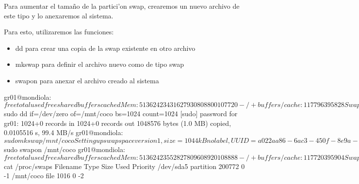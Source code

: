 
Para aumentar el tama\~{n}o de la partici'on swap, crearemos un
nuevo archivo de este tipo y lo anexaremos al sistema.

Para esto, utilizaremos las funciones:

\begin{itemize}
\item dd para crear una copia de la swap existente en otro archivo
\item mkswap para definir el archivo nuevo como de tipo swap
\item swapon para anexar el archivo creado al sistema
\end{itemize}

\begin{envCodigo}
gr01@mondiola:~$ free
             total       used       free     shared    buffers     cached
Mem:        513624     234316     279308          0       8800     107720
-/+ buffers/cache:     117796     395828
Swap:       200772          0     200772
gr01@mondiola:~$ sudo dd if=/dev/zero of=/mnt/coco bs=1024 count=1024
[sudo] password for gr01:
1024+0 records in
1024+0 records out
1048576 bytes (1.0 MB) copied, 0.0105516 s, 99.4 MB/s
gr01@mondiola:~$ sudo mkswap /mnt/coco
Setting up swapspace version 1, size = 1044 kB
no label, UUID=a022aa86-6ac3-450f-8e9a-107066e46c46
gr01@mondiola:~$ sudo swapon /mnt/coco
gr01@mondiola:~$ free
             total       used       free     shared    buffers     cached
Mem:        513624     235528     278096          0       8920     108888
-/+ buffers/cache:     117720     395904
Swap:       201788          0     201788

gr01@mondiola:~$ cat /proc/swaps
Filename                Type        Size    Used    Priority
/dev/sda5                               partition   200772  0   -1
/mnt/coco                               file        1016    0   -2
\end{envCodigo}
